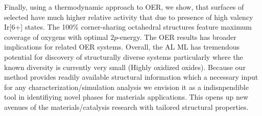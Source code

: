 %
Finally, using a thermodynamic approach to OER, we show,
that surfaces of selected \IrOthree have much higher relative activity that \IrOtwo due to presence of high valency Ir[6+] states.
%
The \num{100}\% corner-sharing octahedral structures feature maximum coverage of oxygens with optimal $2p$-energy.
%
The OER results has broader implications for related OER systems.
%
Overall, the AL ML has tremendous potential for discovery of structurally diverse systems particularly where the known diversity is currently very small (Highly oxidized oxides).
%
Because our method provides readily available structural information which a necessary input for any characterization/simulation analysis we envision it as a indisnpendible tool in identifiying novel phases for materials applications.
%
This opens up new avenues of the materials/catalysis research with tailored structural properties.


